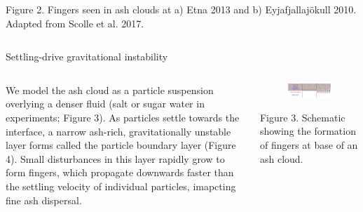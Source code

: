\documentclass[final]{beamer} %
\begin{document}
\begin{frame}[t]
\begin{columns}[t]
\begin{column}{0.3\paperwidth}
      \centering \footnotesize Figure 2. Fingers seen in ash clouds at a) Etna
      2013 and b) Eyjafjallaj{\"o}kull 2010. Adapted from Scolle et al. 2017.
    \end{column}
    
  \end{columns}

  \begin{columns}[t]

    \begin{column}{0.6\paperwidth}

      \begin{block}{Settling-drive gravitational instability}
        \begin{columns}[t]

          \begin{column}{0.2\paperwidth}
            
            \centering We model the ash cloud as a particle suspension overlying
            a denser fluid (salt or sugar water in experiments; Figure 3). As
            particles settle towards the interface, a narrow ash-rich,
            gravitationally unstable layer forms called the particle boundary
            layer (Figure 4). Small disturbances in this layer rapidly grow to
            form fingers, which propagate downwards faster than the settling
            velocity of individual particles, imapcting fine ash dispersal.
            
          \end{column}

          \begin{column}{0.4\paperwidth}

            \begin{figure}
              \includegraphics[width=\textwidth]{sketch.png}
            \end{figure}

            \centering \footnotesize Figure 3. Schematic showing the formation of fingers at
            base of an ash cloud.
            

\end{column}
\end{columns}
\end{block}
\end{column}
\end{columns}
\end{frame}
\end{document}
